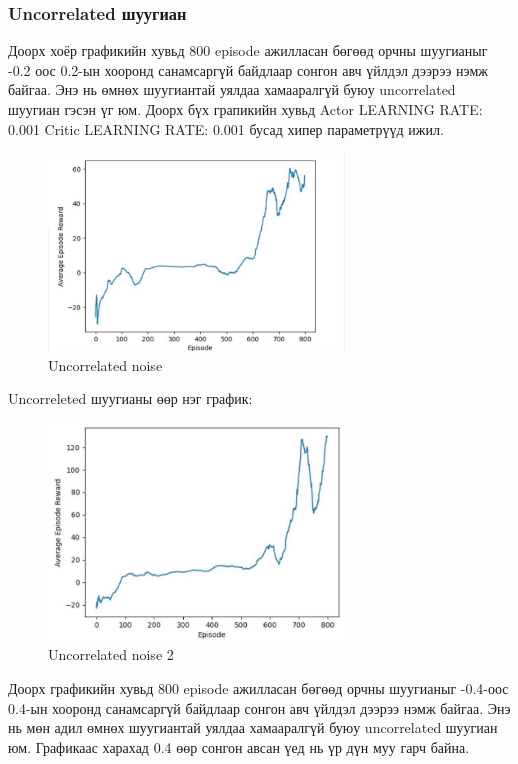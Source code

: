 \documentclass[12pt,A4]{report}
\begin{document}
\subsubsection{Uncorrelated шуугиан}

Доорх хоёр графикийн хувьд 800 episode ажилласан бөгөөд орчны шуугианыг -0.2 оос 0.2-ын хооронд санамсаргүй байдлаар сонгон авч үйлдэл дээрээ нэмж байгаа. Энэ нь өмнөх шуугиантай уялдаа хамааралгүй буюу uncorrelated шуугиан гэсэн үг юм. Доорх бүх грапикийн хувьд Actor LEARNING RATE: 0.001 Critic LEARNING RATE: 0.001 бусад хипер параметрүүд ижил. 

\begin{figure}[H]
\centering
\includegraphics[width=0.7\textwidth]{./images/after_800_ep_02}
\caption{Uncorrelated noise}
\end{figure}

Uncorreleted шуугианы өөр нэг график:

\begin{figure}[H]
\centering
\includegraphics[width=0.7\textwidth]{./images/after_800_ep_02_am}
\caption{Uncorrelated noise 2}
\end{figure}

Доорх графикийн хувьд 800 episode ажилласан бөгөөд орчны шуугианыг -0.4-оос 0.4-ын хооронд санамсаргүй байдлаар сонгон авч үйлдэл дээрээ нэмж байгаа. Энэ нь мөн адил өмнөх шуугиантай уялдаа хамааралгүй буюу uncorrelated шуугиан юм. Графикаас харахад 0.4 өөр сонгон авсан үед нь үр дүн муу гарч байна.
\end{document}
